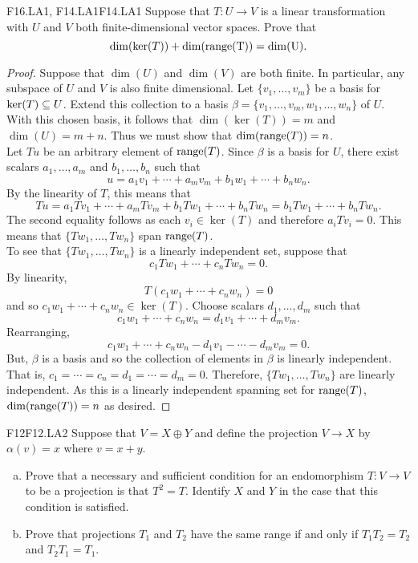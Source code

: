\documentclass[../AlgebraQualSolutions.tex]{subfiles}
\begin{document}
	\begin{prob}{F16.LA1, F14.LA1}{F14.LA1}
		Suppose that $T: U \to V$ is a linear transformation with $U$ and $V$ both finite-dimensional vector spaces. Prove that
			\[\dim(\ker(T)) + \dim(\rm{range}(T)) = \dim(U).\]
	\end{prob}

	\begin{proof}
		Suppose that $\dim(U)$ and $\dim(V)$ are both finite. In particular, any subspace of $U$ and $V$ is also finite dimensional. Let $\{v_1,\ldots, v_m\}$ be a basis for $\ker(T) \subseteq U$. Extend this collection to a basis $\beta = \{v_1,\ldots, v_m, w_1,\ldots, w_n\}$ of $U$. With this chosen basis, it follows that $\dim(\ker(T)) = m$ and $\dim(U) = m + n$. Thus we must show that $\dim(\mathrm{range}(T)) = n$.\\

		Let $Tu$ be an arbitrary element of $\mathrm{range}(T)$. Since $\beta$ is a basis for $U$, there exist scalars $a_1,\ldots, a_m$ and $b_1,\ldots,b_n$ such that
			\[u = a_1v_1 + \cdots + a_mv_m + b_1w_1 + \cdots + b_nw_n. \]
		By the linearity of $T$, this means that
			\[Tu = a_1Tv_1 + \cdots + a_mTv_m + b_1Tw_1 + \cdots + b_nTw_n = b_1Tw_1 + \cdots + b_nTw_n.\]
		The second equality follows as each $v_i \in \ker(T)$ and therefore $a_iTv_i = 0$. This means that $\{Tw_1,\ldots,Tw_n\}$ span $\mathrm{range}(T)$.\\

		To see that $\{Tw_1,\ldots,Tw_n\}$ is a linearly independent set, suppose that
			\[c_1Tw_1 + \cdots + c_nTw_n = 0.\]
		By linearity,
			\[T(c_1w_1 + \cdots + c_nw_n) = 0\]
		and so $c_1w_1 + \cdots + c_nw_n \in \ker(T)$. Choose scalars $d_1,\ldots, d_m$ such that
			\[c_1w_1 + \cdots + c_nw_n = d_1v_1 + \cdots + d_mv_m.\]
		Rearranging,
			\[c_1w_1 + \cdots + c_nw_n - d_1v_1 - \cdots - d_mv_m = 0.\]
		But, $\beta$ is a basis and so the collection of elements in $\beta$ is linearly independent. That is, $c_1 = \cdots = c_n = d_1 = \cdots = d_m = 0$. Therefore, $\{Tw_1,\ldots,Tw_n\}$ are linearly independent. As this is a linearly independent spanning set for $\mathrm{range}(T)$, $\dim(\mathrm{range}(T)) = n$ as desired.
	\end{proof}

	\begin{prob}{F12}{F12.LA2}
	Suppose that $V = X \oplus Y$ and define the projection $V \to X$ by $\alpha(v) = x$ where $v = x+y$.
	\begin{enumerate}[(a)]
	\item Prove that a necessary and sufficient condition for an endomorphism $T: V \to V$ to be a projection is that $T^2 = T$. Identify $X$ and $Y$ in the case that this condition is satisfied.
	\item Prove that projections $T_1$ and $T_2$ have the same range if and only if $T_1T_2 = T_2$ and $T_2T_1 = T_1$.
	\end{enumerate}
	\end{prob}
\end{document}
